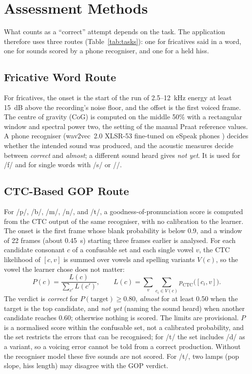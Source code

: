 \documentclass[engproc,article,submit,moreauthors]{Definitions/mdpi}
\newcommand{\ipa}[1]{/#1/}
\begin{document}
\section{Assessment Methods}
What counts as a ``correct'' attempt depends on the task. The application therefore uses three routes (Table~\ref{tab:tasks}): one for fricatives said in a word, one for sounds scored by a phone recogniser, and one for a held hiss.

\subsection{Fricative Word Route}
For fricatives, the onset is the start of the run of 2.5--12~kHz energy at least 15~dB above the recording's noise floor, and the offset is the first voiced frame. The centre of gravity (CoG) is computed on the middle 50\% with a rectangular window and spectral power two, the setting of the manual Praat reference values. A phone recogniser (wav2vec~2.0 XLSR-53 fine-tuned on eSpeak phones \cite{baevski2020,xu2022}) decides whether the intended sound was produced, and the acoustic measures decide between \textit{correct} and \textit{almost}; a different sound heard gives \textit{not yet}. It is used for \ipa{f} and for single words with \ipa{s} or \ipa{\textesh}.

\subsection{CTC-Based GOP Route}
For \ipa{p}, \ipa{b}, \ipa{m}, \ipa{n}, and \ipa{t\textesh}, a goodness-of-pronunciation score is computed from the CTC output of the same recogniser, with no calibration to the learner. The onset is the first frame whose blank probability is below 0.9, and a window of 22 frames (about 0.45~s) starting three frames earlier is analysed. For each candidate consonant $c$ of a confusable set and each single vowel $v$, the CTC likelihood of $[c,v]$ is summed over vowels and spelling variants $V(c)$, so the vowel the learner chose does not matter:
\begin{equation}
P(c)=\frac{L(c)}{\sum_{c'} L(c')},\qquad L(c)=\sum_{v}\sum_{c_i\in V(c)} p_{\mathrm{CTC}}\bigl([c_i,v]\bigr).
\end{equation}
The verdict is \textit{correct} for $P(\text{target})\geq0.80$, \textit{almost} for at least 0.50 when the target is the top candidate, and \textit{not yet} (naming the sound heard) when another candidate reaches 0.60; otherwise nothing is scored. The limits are provisional. $P$ is a normalised score within the confusable set, not a calibrated probability, and the set restricts the errors that can be recognised; for \ipa{t\textesh} the set includes \ipa{d\textyogh} as a variant, so a voicing error cannot be told from a correct production. Without the recogniser model these five sounds are not scored. For \ipa{t\textesh}, two lamps (pop slope, hiss length) may disagree with the GOP verdict.
\end{document}
